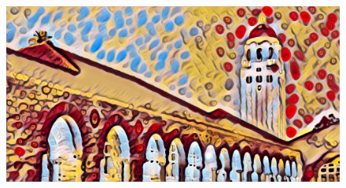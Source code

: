 \documentclass[12pt,center]{beamer}
\begin{document}
\begin{frame}
\begin{figure}[h]
\begin{center}
	{\includegraphics[height=0.20\textheight]{./img/jhonson_result_tower_candy.jpg}}
      
    \end{center}
  \end{figure}  
\end{frame}	
  
  
\end{document}
